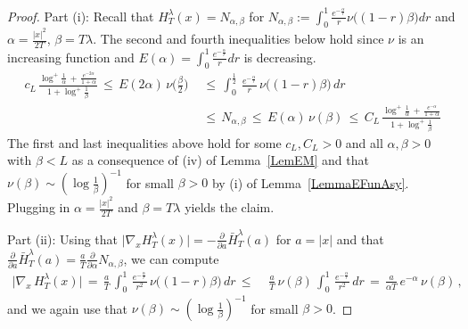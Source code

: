 \documentclass[10pt]{article}
\numberwithin{equation}{section}
\theoremstyle{definition}
\begin{document}
\begin{proof}  Part (i): Recall that $H_{ T}^{\lambda}(x)=N_{\alpha,\beta}$ for $N_{\alpha,\beta}:=\int_{0}^1 \frac{e^{-\frac{\alpha}{r} }}{r} \nu \big( (1-r) \beta\big) dr$ and $\alpha=\frac{ |x|^2 }{ 2T }$, $\beta=T\lambda$. The second and fourth inequalities below hold since $\nu$ is an increasing function and $E(\alpha)=\int_{0}^1 \frac{e^{-\frac{\alpha}{r} }}{r} dr$ is decreasing.
\begin{align}\label{NAlphaBeta}
 \, c_L\, \frac{\log^+ \frac{1}{\alpha} \,+\,\frac{e^{ -2\alpha  }}{ 1+ \alpha }  }{ 1+\log^+\frac{1}{\beta}  }\,\leq \,E(2\alpha   )\,\nu\Big(\frac{\beta}{2}\Big)\, & \,\leq \,  \int_{0}^{\frac{1}{2}}\,  \frac{e^{-\frac{\alpha}{r} }}{r}\,\nu\big((1-r)\beta\big) \,dr\nonumber \\  & \, \leq \, N_{\alpha,\beta}  \,\leq \, E (\alpha)\,\nu(\beta) \, \leq  \, C_L\, \frac{\log^+ \frac{1}{\alpha} \,+\,\frac{e^{ -\alpha  }}{ 1+ \alpha }  }{ 1+\log^+\frac{1}{\beta}  } 
  \end{align}
 The first and last inequalities above hold for some $c_L,C_L>0$ and all $\alpha,\beta>0$ with $ \beta<L$ as a consequence of (iv) of Lemma~\ref{LemEM} and that $\nu(\beta)\sim (\log\frac{1}{\beta})^{-1}$ for small $\beta>0$ by (i) of Lemma~\ref{LemmaEFunAsy}.  Plugging in  $\alpha=\frac{ |x|^2 }{ 2T }$ and $\beta=T\lambda$ yields the claim. \vspace{.3cm}





\noindent Part (ii): Using that $\big| \nabla_x H_{ T}^{\lambda}(x)\big|=-\frac{\partial}{\partial a}\bar{H}_{ T}^{\lambda}(a)$ for $a=|x|$ and that $\frac{\partial}{\partial a}\bar{H}_{ T}^{\lambda}(a)=\frac{a}{T}\frac{\partial}{\partial \alpha}N_{\alpha, \beta} $, we can compute 
\begin{align*}
\big| \nabla_x \,H_{ T}^{\lambda}(x)\big|\,=\, \frac{a}{T}\,\int_0^1 \, \frac{e^{-\frac{\alpha}{r} }}{r^2}\,\nu\big((1-r)  \beta \big)\,dr 
\, \leq  \,&\,\frac{a}{T}\,\nu(\beta )\,\int_0^1\,  \frac{e^{-\frac{\alpha}{r} }}{r^2}\,dr \nonumber  
\,=\,\frac{a }{\alpha T }\, e^{- \alpha   }\, \nu(\beta)  \,, 
\end{align*}
and we again use that $\nu(\beta)\sim (\log\frac{1}{\beta})^{-1}$ for small $\beta>0$.
\end{proof}
\end{document}
